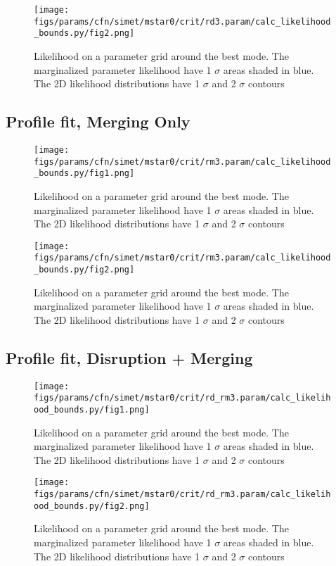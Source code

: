 \documentclass[twocolumn]{article}
\begin{document}
\begin{figure}[H]
  \center\texttt{[image: figs/params/cfn/simet/mstar0/crit/rd3.param/calc\_likelihood\_bounds.py/fig2.png]}
  \caption{Likelihood on a parameter grid around the best mode. The marginalized parameter likelihood have
    1 $\sigma$ areas shaded in blue. The 2D likelihood distributions have 1 $\sigma$  and 2 $\sigma$ contours}
  \label{fig:basic_rd:likelihood}
\end{figure}

\subsection{Profile fit, Merging Only}
\begin{figure}[H]
  \center\texttt{[image: figs/params/cfn/simet/mstar0/crit/rm3.param/calc\_likelihood\_bounds.py/fig1.png]}
  \caption{Likelihood on a parameter grid around the best mode. The marginalized parameter likelihood have
    1 $\sigma$ areas shaded in blue. The 2D likelihood distributions have 1 $\sigma$  and 2 $\sigma$ contours}
  \label{fig:basic_rd:likelihood}
\end{figure}

\begin{figure}[H]
  \center\texttt{[image: figs/params/cfn/simet/mstar0/crit/rm3.param/calc\_likelihood\_bounds.py/fig2.png]}
  \caption{Likelihood on a parameter grid around the best mode. The marginalized parameter likelihood have
    1 $\sigma$ areas shaded in blue. The 2D likelihood distributions have 1 $\sigma$  and 2 $\sigma$ contours}
  \label{fig:basic_rd:likelihood}
\end{figure}


\subsection{Profile fit, Disruption + Merging}
\begin{figure}[H]
  \center\texttt{[image: figs/params/cfn/simet/mstar0/crit/rd\_rm3.param/calc\_likelihood\_bounds.py/fig1.png]}
  \caption{Likelihood on a parameter grid around the best mode. The marginalized parameter likelihood have
    1 $\sigma$ areas shaded in blue. The 2D likelihood distributions have 1 $\sigma$  and 2 $\sigma$ contours}
  \label{fig:basic_rd:likelihood}
\end{figure}

\begin{figure}[H]
  \center\texttt{[image: figs/params/cfn/simet/mstar0/crit/rd\_rm3.param/calc\_likelihood\_bounds.py/fig2.png]}
  \caption{Likelihood on a parameter grid around the best mode. The marginalized parameter likelihood have
    1 $\sigma$ areas shaded in blue. The 2D likelihood distributions have 1 $\sigma$  and 2 $\sigma$ contours}
  \label{fig:basic_rd:likelihood}
\end{figure}
\end{document}
